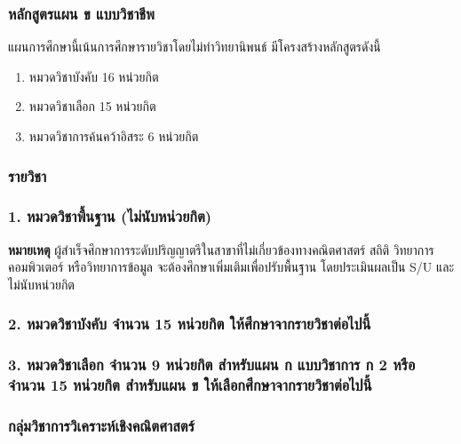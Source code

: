 \subsubsection*{หลักสูตรแผน ข แบบวิชาชีพ} 
แผนการศึกษานี้เน้นการศึกษารายวิชาโดยไม่ทำวิทยานิพนธ์ มีโครงสร้างหลักสูตรดังนี้

\begin{enumerate}
	\item หมวดวิชาบังคับ \hfill 16 หน่วยกิต
	\item หมวดวิชาเลือก \hfill 15 หน่วยกิต
	\item หมวดวิชาการค้นคว้าอิสระ \hfill 6 หน่วยกิต
\end{enumerate}

\clearpage
\subsubsection{รายวิชา}

\subsubsection*{1. หมวดวิชาพื้นฐาน (ไม่นับหน่วยกิต)}



\par\noindent\textbf{หมายเหตุ} ผู้สำเร็จศึกษาการระดับปริญญาตรีในสาขาที่ไม่เกี่ยวข้องทางคณิตศาสตร์ สถิติ วิทยาการคอมพิวเตอร์ หรือวิทยาการข้อมูล จะต้องศึกษาเพิ่มเติมเพื่อปรับพื้นฐาน โดยประเมินผลเป็น S/U และไม่นับหน่วยกิต


\subsubsection*{2. หมวดวิชาบังคับ จำนวน 15 หน่วยกิต ให้ศึกษาจากรายวิชาต่อไปนี้}



\subsubsection*{3. หมวดวิชาเลือก จำนวน 9 หน่วยกิต สำหรับแผน ก แบบวิชาการ ก 2 หรือ จำนวน 15 หน่วยกิต สำหรับแผน ข ให้เลือกศึกษาจากรายวิชาต่อไปนี้}

\subsubsection*{กลุ่มวิชาการวิเคราะห์เชิงคณิตศาสตร์}



